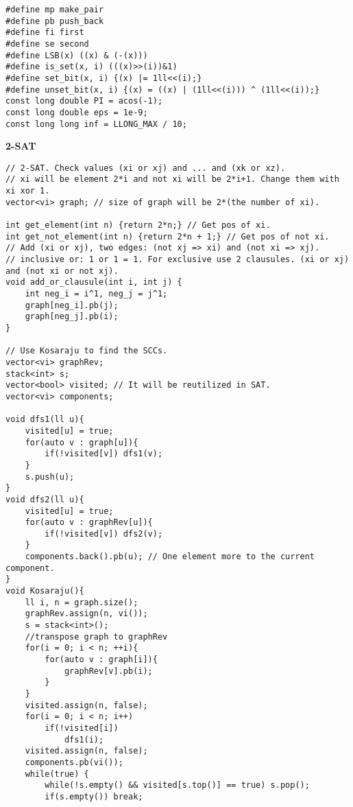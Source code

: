\documentclass[a4paper,10pt]{article}
\newcommand{\titleAlg}[1]{\vspace{-10pt}
\begin{center}\textbf{#1}\end{center} \vspace{-10pt}}
\begin{document}
\begin{multicols}{2}
\begin{verbatim}
#define mp make_pair
#define pb push_back
#define fi first
#define se second
#define LSB(x) ((x) & (-(x)))
#define is_set(x, i) (((x)>>(i))&1)
#define set_bit(x, i) {(x) |= 1ll<<(i);}
#define unset_bit(x, i) {(x) = ((x) | (1ll<<(i))) ^ (1ll<<(i));}
const long double PI = acos(-1);
const long double eps = 1e-9;
const long long inf = LLONG_MAX / 10;
\end{verbatim}
\end{multicols}

\titleAlg{2-SAT}
\begin{multicols}{2}
\begin{verbatim}
// 2-SAT. Check values (xi or xj) and ... and (xk or xz).
// xi will be element 2*i and not xi will be 2*i+1. Change them with xi xor 1.
vector<vi> graph; // size of graph will be 2*(the number of xi).

int get_element(int n) {return 2*n;} // Get pos of xi.
int get_not_element(int n) {return 2*n + 1;} // Get pos of not xi.
// Add (xi or xj), two edges: (not xj => xi) and (not xi => xj).
// inclusive or: 1 or 1 = 1. For exclusive use 2 clausules. (xi or xj) and (not xi or not xj).
void add_or_clausule(int i, int j) {
    int neg_i = i^1, neg_j = j^1;
    graph[neg_i].pb(j);
    graph[neg_j].pb(i);
}

// Use Kosaraju to find the SCCs.
vector<vi> graphRev;
stack<int> s;
vector<bool> visited; // It will be reutilized in SAT.
vector<vi> components;

void dfs1(ll u){
    visited[u] = true;
    for(auto v : graph[u]){
        if(!visited[v]) dfs1(v);
    }
    s.push(u);
}
void dfs2(ll u){
    visited[u] = true;
    for(auto v : graphRev[u]){
        if(!visited[v]) dfs2(v);
    }
    components.back().pb(u); // One element more to the current component.
}
void Kosaraju(){
    ll i, n = graph.size();
    graphRev.assign(n, vi());
    s = stack<int>();
    //transpose graph to graphRev
    for(i = 0; i < n; ++i){
        for(auto v : graph[i]){
            graphRev[v].pb(i);
        }
    }
    visited.assign(n, false);
    for(i = 0; i < n; i++)
        if(!visited[i])
            dfs1(i);
    visited.assign(n, false);
    components.pb(vi());
    while(true) {
        while(!s.empty() && visited[s.top()] == true) s.pop();
        if(s.empty()) break;


\end{verbatim}
\end{multicols}
\end{document}
